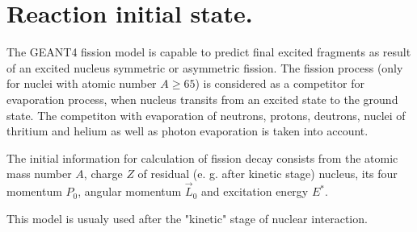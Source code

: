 \section{Reaction initial state.}

\hspace{1.0em} The GEANT4 fission model is capable to predict 
final excited fragments as result of an excited 
nucleus  
symmetric or asymmetric fission.  The
fission process (only for nuclei with atomic number 
$A \geq 65$) is considered as a
competitor for evaporation process, when nucleus transits from an
excited state to the ground state.  The competiton with 
evaporation of neutrons,
protons, deutrons, nuclei of thritium and helium as well as 
photon evaporation is taken into
account. 

The initial information for calculation of fission
decay consists from the atomic mass number $A$, charge $Z$ of residual
(e. g. after kinetic stage) nucleus, its four momentum $P_0$, angular 
momentum $\vec{L}_0$ and  excitation energy $E^{*}$.   

This model is usualy used after the "kinetic" stage of nuclear interaction.
